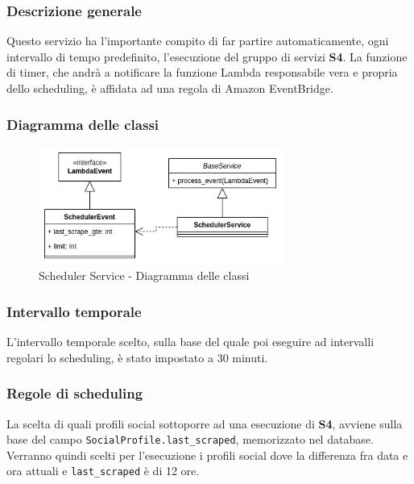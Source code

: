 \subsubsection{Descrizione generale}
Questo servizio ha l'importante compito di far partire automaticamente,
ogni intervallo di tempo predefinito, l'esecuzione del gruppo di servizi \textbf{S4}.
La funzione di timer, che andrà a notificare la funzione Lambda responsabile vera e propria dello
scheduling, è affidata ad una regola di Amazon EventBridge.

\subsubsection{Diagramma delle classi}
\begin{figure}[H]
    \includegraphics[width=8cm]{sezioni/images/cd_scheduler.png}
    \centering
    \caption{Scheduler Service - Diagramma delle classi}
\end{figure}

\subsubsection{Intervallo temporale}
L'intervallo temporale scelto, sulla base del quale poi eseguire ad intervalli regolari lo scheduling,
è stato impostato a 30 minuti.

\subsubsection{Regole di scheduling}
La scelta di quali profili social sottoporre ad una esecuzione di \textbf{S4}, avviene sulla base del
campo \verb|SocialProfile.last_scraped|, memorizzato nel database. Verranno quindi scelti per l'esecuzione
i profili social dove la differenza fra data e ora attuali e \verb|last_scraped| è di 12 ore.
